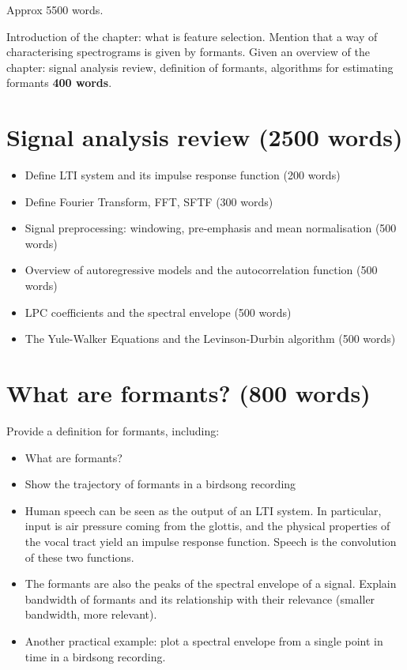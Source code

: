 \documentclass[../main.tex]{subfiles}
\begin{document}
 \label{chapter_formants}
Approx 5500 words.
\par Introduction of the chapter: what is feature selection. Mention that a way of characterising spectrograms is given by formants. Given an overview of the chapter: signal analysis review, definition of formants, algorithms for estimating formants \textbf{400 words}.

\section{Signal analysis review (2500 words)}
    \begin{itemize}
    \item Define LTI system and its impulse response function (200 words)
    \item Define Fourier Transform, FFT, SFTF (300 words)
    \item Signal preprocessing: windowing, pre-emphasis and mean normalisation (500 words)
    \item Overview of autoregressive models and the autocorrelation function (500 words)
    \item LPC coefficients and the spectral envelope (500 words)
    \item The Yule-Walker Equations and the Levinson-Durbin algorithm (500 words)
    \end{itemize}
    

\section{What are formants? (800 words)}
    Provide a definition for formants, including:
    \begin{itemize}
    \item What are formants? 
    \item Show the trajectory of formants in a birdsong recording
    \item Human speech can be seen as the output of an LTI system. In particular, input is air pressure coming from the glottis, and the physical properties of the vocal tract yield an impulse response function. Speech is the convolution of these two functions. %
    \item The formants are also the peaks of the spectral envelope of a signal. Explain bandwidth of formants and its relationship with their relevance (smaller bandwidth, more relevant).
    \item Another practical example: plot a spectral envelope from a single point in time in a birdsong recording.
    \end{itemize}
\end{document}
